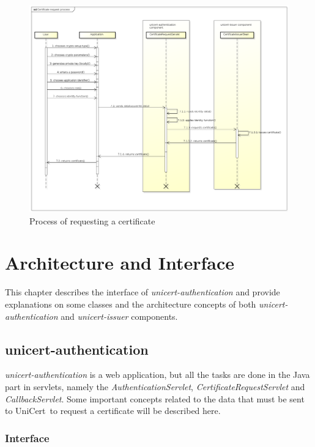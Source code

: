 \documentclass[oneside]{scrreprt}
\newcommand{\unicert}{\mbox{UniCert}}
\begin{document}
\begin{figure}[ht]
\centerline{
\includegraphics[width=1.0\textwidth]{figs/certificate_request_process}}
\caption{Process of requesting a certificate}
\label{fig:request_process}
\end{figure}

\chapter{Architecture and Interface} \label{chap:architecture}
This chapter describes the interface of \textit{unicert-authentication} and provide explanations on some classes and the architecture concepts of both \textit{unicert-authentication} and \textit{unicert-issuer} components.

\section{unicert-authentication}

\textit{unicert-authentication} is a web application, but all the tasks are done in the Java part in servlets, namely the \textit{AuthenticationServlet}, \textit{CertificateRequestServlet} and \textit{CallbackServlet}. Some important concepts related to the data that must be sent to \unicert\ to request a certificate will be described here.

\subsection{Interface}
\end{document}
